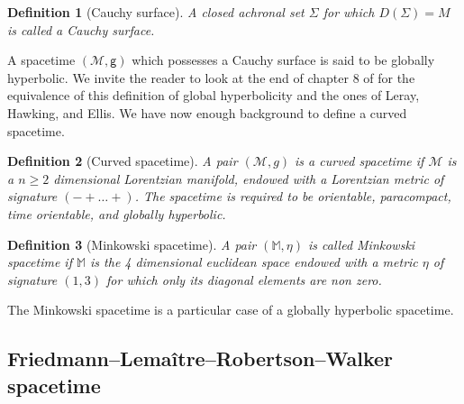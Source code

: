 \documentclass[11pt]{book}
\newcommand{\Mcal}{\mathcal{M}}
\newcommand{\Mbb}{\mathbb{M}}
\newcommand{\gsf}{\mathsf{g}}
\theoremstyle{break}
\newtheorem{definition}{Definition}[chapter]
\begin{document}
\bigskip


\begin{definition}[Cauchy surface]
A closed achronal set $\Sigma$ for which $D(\Sigma) = M$ is called a Cauchy surface. 
\end{definition}

A spacetime $(\Mcal,\gsf)$ which possesses a Cauchy surface is said to be globally hyperbolic. We invite the reader to look at the end of chapter $8$ of \cite{waldGR} for the equivalence of this definition of global hyperbolicity and the ones of Leray, Hawking, and Ellis. 
We have now enough background to define a curved spacetime.

\begin{definition}[Curved spacetime]\label{def:cst}
A pair $(\Mcal,g)$ is a curved spacetime if $\Mcal$ is a $n \geq 2$ dimensional Lorentzian manifold, endowed with a Lorentzian metric of signature $( - + \dots +)$. The spacetime is required to be orientable, paracompact, time orientable, and globally hyperbolic. 
\end{definition}


\begin{definition}[Minkowski spacetime]\label{def:minkowski}
A pair $(\Mbb,\eta)$ is called Minkowski spacetime if $\Mbb$ is the 4 dimensional euclidean space endowed with a metric $\eta$ of signature $(1,3)$ for which only its diagonal elements are non zero.
\end{definition}


The Minkowski spacetime is a particular case of a globally hyperbolic spacetime. 


\subsection{Friedmann--Lemaître--Robertson--Walker spacetime}
\label{p:FLRW}
\end{document}
